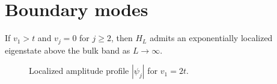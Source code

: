 \section{Boundary modes}\label{sec:modes}
\begin{thm}\label{thm:edge}
If $v_1 > t$ and $v_j=0$ for $j\ge 2$, then $H_L$ admits an exponentially localized eigenstate above the bulk band as $L\to\infty$.
\end{thm}
\begin{figure}[t]
\centering
\caption{Localized amplitude profile $|\psi_j|$ for $v_1=2t$.}\label{fig:edge}
\end{figure}
